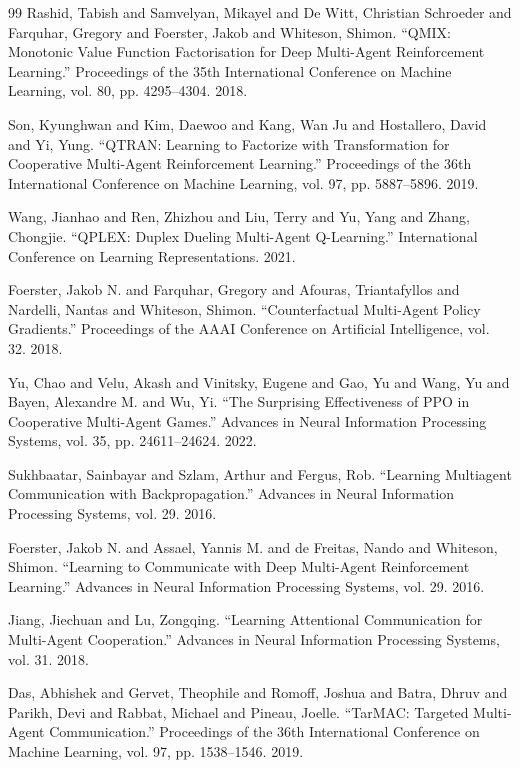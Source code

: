 \documentclass[fleqn,10pt]{wlpeerj}
\begin{document}
\begin{thebibliography}{99}
 Rashid, Tabish and Samvelyan, Mikayel and De Witt, Christian Schroeder and Farquhar, Gregory and Foerster, Jakob and Whiteson, Shimon. ``QMIX: Monotonic Value Function Factorisation for Deep Multi-Agent Reinforcement Learning.'' Proceedings of the 35th International Conference on Machine Learning, vol. 80, pp. 4295--4304. 2018.

 Son, Kyunghwan and Kim, Daewoo and Kang, Wan Ju and Hostallero, David and Yi, Yung. ``QTRAN: Learning to Factorize with Transformation for Cooperative Multi-Agent Reinforcement Learning.'' Proceedings of the 36th International Conference on Machine Learning, vol. 97, pp. 5887--5896. 2019.

 Wang, Jianhao and Ren, Zhizhou and Liu, Terry and Yu, Yang and Zhang, Chongjie. ``QPLEX: Duplex Dueling Multi-Agent Q-Learning.'' International Conference on Learning Representations. 2021.

 Foerster, Jakob N. and Farquhar, Gregory and Afouras, Triantafyllos and Nardelli, Nantas and Whiteson, Shimon. ``Counterfactual Multi-Agent Policy Gradients.'' Proceedings of the AAAI Conference on Artificial Intelligence, vol. 32. 2018.

 Yu, Chao and Velu, Akash and Vinitsky, Eugene and Gao, Yu and Wang, Yu and Bayen, Alexandre M. and Wu, Yi. ``The Surprising Effectiveness of PPO in Cooperative Multi-Agent Games.'' Advances in Neural Information Processing Systems, vol. 35, pp. 24611--24624. 2022.

 Sukhbaatar, Sainbayar and Szlam, Arthur and Fergus, Rob. ``Learning Multiagent Communication with Backpropagation.'' Advances in Neural Information Processing Systems, vol. 29. 2016.

 Foerster, Jakob N. and Assael, Yannis M. and de Freitas, Nando and Whiteson, Shimon. ``Learning to Communicate with Deep Multi-Agent Reinforcement Learning.'' Advances in Neural Information Processing Systems, vol. 29. 2016.

 Jiang, Jiechuan and Lu, Zongqing. ``Learning Attentional Communication for Multi-Agent Cooperation.'' Advances in Neural Information Processing Systems, vol. 31. 2018.

 Das, Abhishek and Gervet, Theophile and Romoff, Joshua and Batra, Dhruv and Parikh, Devi and Rabbat, Michael and Pineau, Joelle. ``TarMAC: Targeted Multi-Agent Communication.'' Proceedings of the 36th International Conference on Machine Learning, vol. 97, pp. 1538--1546. 2019.


\end{thebibliography}
\end{document}
